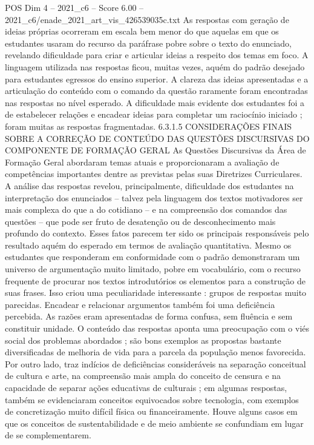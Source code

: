 \begin{textsample}{POS Dim 4 – 2021\_c6 – Score 6.00 – 2021\_c6/enade\_2021\_art\_vis\_426539035c.txt}
As respostas com geração de ideias próprias ocorreram em escala bem menor do que aquelas em que os estudantes usaram do recurso da paráfrase pobre sobre o texto do enunciado, revelando dificuldade para criar e articular ideias a respeito dos temas em foco.
A linguagem utilizada nas respostas ficou, muitas vezes, aquém do padrão desejado para estudantes egressos do ensino superior.
A clareza das ideias apresentadas e a articulação do conteúdo com o comando da questão raramente foram encontradas nas respostas no nível esperado.
A dificuldade mais evidente dos estudantes foi a de estabelecer relações e encadear ideias para completar um raciocínio iniciado ; foram muitas as respostas fragmentadas. 6.3.1.5 CONSIDERAÇÕES FINAIS SOBRE A CORREÇÃO DE CONTEÚDO DAS QUESTÕES DISCURSIVAS DO COMPONENTE DE FORMAÇÃO GERAL As Questões Discursivas da Área de Formação Geral abordaram temas atuais e proporcionaram a avaliação de competências importantes dentre as previstas pelas suas Diretrizes Curriculares.
A análise das respostas revelou, principalmente, dificuldade dos estudantes na interpretação dos enunciados – talvez pela linguagem dos textos motivadores ser mais complexa do que a do cotidiano – e na compreensão dos comandos das questões – que pode ser fruto de desatenção ou de desconhecimento mais profundo do contexto.
Esses fatos parecem ter sido os principais responsáveis pelo resultado aquém do esperado em termos de avaliação quantitativa.
Mesmo os estudantes que responderam em conformidade com o padrão demonstraram um universo de argumentação muito limitado, pobre em vocabulário, com o recurso frequente de procurar nos textos introdutórios os elementos para a construção de suas frases.
Isso criou uma peculiaridade interessante : grupos de respostas muito parecidas.
Encadear e relacionar argumentos também foi uma deficiência percebida.
As razões eram apresentadas de forma confusa, sem fluência e sem constituir unidade.
O conteúdo das respostas aponta uma preocupação com o viés social dos problemas abordados ; são bons exemplos as propostas bastante diversificadas de melhoria de vida para a parcela da população menos favorecida.
Por outro lado, traz indícios de deficiências consideráveis na separação conceitual de cultura e arte, na compreensão mais ampla do conceito de censura e na capacidade de separar ações educativas de culturais ; em algumas respostas, também se evidenciaram conceitos equivocados sobre tecnologia, com exemplos de concretização muito difícil física ou financeiramente.
Houve alguns casos em que os conceitos de sustentabilidade e de meio ambiente se confundiam em lugar de se complementarem.

\end{textsample}
